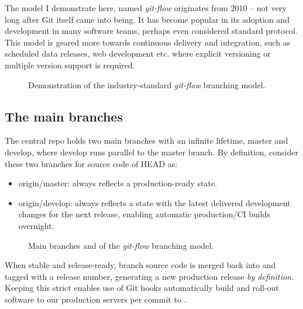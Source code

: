 The model I demonstrate here, named \emph{git-flow} originates from 2010 -- not very long after Git itself came into being. It has become popular in its adoption and development in many software teams, perhaps even considered standard protocol. This model is geared more towards continuous delivery and integration, such as scheduled data releases, web development etc. where explicit versioning or multiple version support is required.

\vspace{11\baselineskip}%
\begin{figure}[H]
	\centering
	\noindent\resizebox{\textwidth}{!}{}
	\caption[A successful Git branching model]{Demonstration of the industry-standard \emph{git-flow} branching model.}
\end{figure}



\subsection{The main branches}

The central repo holds two main branches with an infinite lifetime, master and develop, where develop runs parallel to the master branch. By definition, consider these two branches for source code of HEAD as:

\begin{itemize}
	\item origin/master: always reflects a production-ready state.
	\item origin/develop: always reflects a state with the latest delivered development changes for the next release, enabling automatic production/CI builds overnight.
\end{itemize}

\vspace{6\baselineskip}%
\begin{figure}[H]
	\centering
	\noindent\resizebox{.66\textwidth}{!}{}
	\caption[Main branches]{Main branches  and  of the \emph{git-flow} branching model.}
\end{figure}

When stable and release-ready,  branch source code is merged back into  and tagged with a release number, generating a new production release \emph{by definition}. Keeping this strict enables use of Git hooks automatically build and roll-out software to our production servers per commit to .

